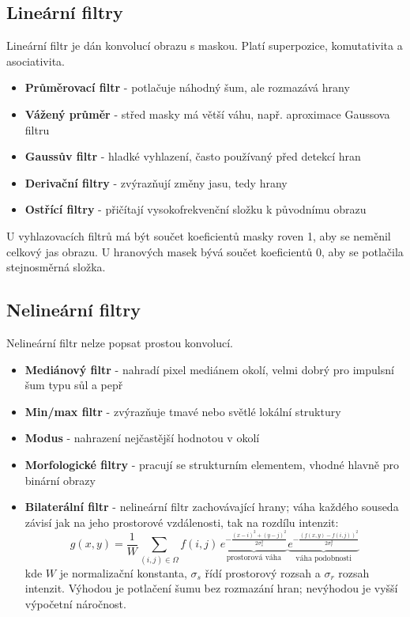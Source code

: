 \subsection*{Lineární filtry}
Lineární filtr je dán konvolucí obrazu s maskou. Platí superpozice, komutativita a asociativita.
\begin{itemize}
    \item \textbf{Průměrovací filtr} - potlačuje náhodný šum, ale rozmazává hrany
    \item \textbf{Vážený průměr} - střed masky má větší váhu, např. aproximace Gaussova filtru
    \item \textbf{Gaussův filtr} - hladké vyhlazení, často používaný před detekcí hran
    \item \textbf{Derivační filtry} - zvýrazňují změny jasu, tedy hrany
    \item \textbf{Ostřící filtry} - přičítají vysokofrekvenční složku k původnímu obrazu
\end{itemize}
U vyhlazovacích filtrů má být součet koeficientů masky roven 1, aby se neměnil celkový jas obrazu.
U hranových masek bývá součet koeficientů 0, aby se potlačila stejnosměrná složka.

\subsection*{Nelineární filtry}
Nelineární filtr nelze popsat prostou konvolucí.
\begin{itemize}
    \item \textbf{Mediánový filtr} - nahradí pixel mediánem okolí, velmi dobrý pro impulsní šum typu sůl a pepř
    \item \textbf{Min/max filtr} - zvýrazňuje tmavé nebo světlé lokální struktury
    \item \textbf{Modus} - nahrazení nejčastější hodnotou v okolí
    \item \textbf{Morfologické filtry} - pracují se strukturním elementem, vhodné hlavně pro binární obrazy
    \item \textbf{Bilaterální filtr} - nelineární filtr zachovávající hrany; váha každého souseda závisí jak na jeho prostorové vzdálenosti, tak na rozdílu intenzit:
          \begin{equation}
              g(x,y)=\frac{1}{W}\sum_{(i,j)\in\Omega}
              f(i,j)\,\underbrace{e^{-\frac{(x-i)^2+(y-j)^2}{2\sigma_s^2}}}_{\text{prostorová váha}}
              \underbrace{e^{-\frac{(f(x,y)-f(i,j))^2}{2\sigma_r^2}}}_{\text{váha podobnosti}}
          \end{equation}
          kde $W$ je normalizační konstanta, $\sigma_s$ řídí prostorový rozsah a $\sigma_r$ rozsah intenzit.
          Výhodou je potlačení šumu bez rozmazání hran; nevýhodou je vyšší výpočetní náročnost.
\end{itemize}

